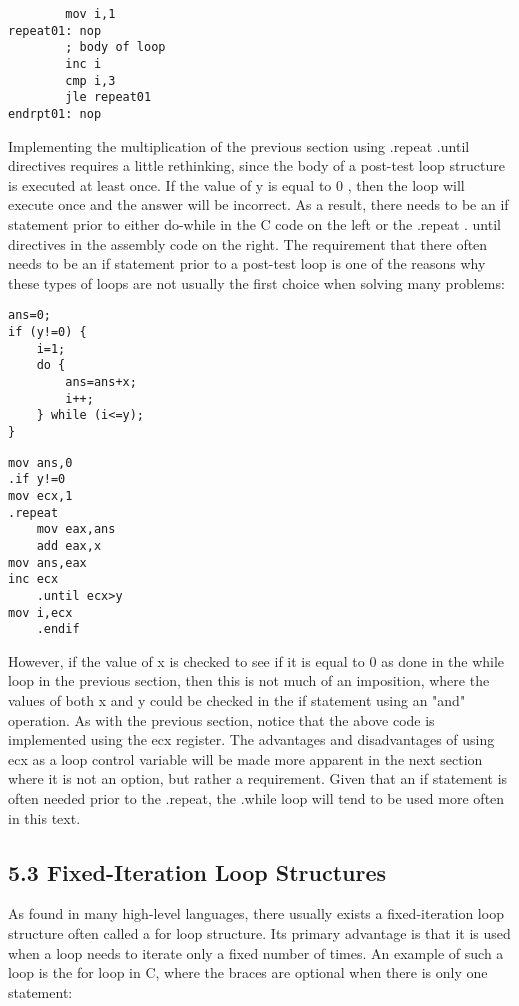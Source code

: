 \documentclass[10pt]{article}
\begin{document}
\begin{verbatim}
        mov i,1
repeat01: nop
        ; body of loop
        inc i
        cmp i,3
        jle repeat01
endrpt01: nop
\end{verbatim}

Implementing the multiplication of the previous section using .repeat .until directives requires a little rethinking, since the body of a post-test loop structure is executed at least once. If the value of y is equal to 0 , then the loop will execute once and the answer will be incorrect. As a result, there needs to be an if statement prior to either do-while in the C code on the left or the .repeat . until directives in the assembly code on the right. The requirement that there often needs to be an if statement prior to a post-test loop is one of the reasons why these types of loops are not usually the first choice when solving many problems:

\begin{verbatim}
ans=0;
if (y!=0) {
    i=1;
    do {
        ans=ans+x;
        i++;
    } while (i<=y);
}
\end{verbatim}

\begin{verbatim}
mov ans,0
.if y!=0
mov ecx,1
.repeat
    mov eax,ans
    add eax,x
mov ans,eax
inc ecx
    .until ecx>y
mov i,ecx
    .endif
\end{verbatim}

However, if the value of x is checked to see if it is equal to 0 as done in the while loop in the previous section, then this is not much of an imposition, where the values of both x and y could be checked in the if statement using an "and" operation. As with the previous section, notice that the above code is implemented using the ecx register. The advantages and disadvantages of using ecx as a loop control variable will be made more apparent in the next section where it is not an option, but rather a requirement. Given that an if statement is often needed prior to the .repeat, the .while loop will tend to be used more often in this text.

\subsection*{5.3 Fixed-Iteration Loop Structures}
As found in many high-level languages, there usually exists a fixed-iteration loop structure often called a for loop structure. Its primary advantage is that it is used when a loop needs to iterate only a fixed number of times. An example of such a loop is the for loop in C, where the braces are optional when there is only one statement:
\end{document}
